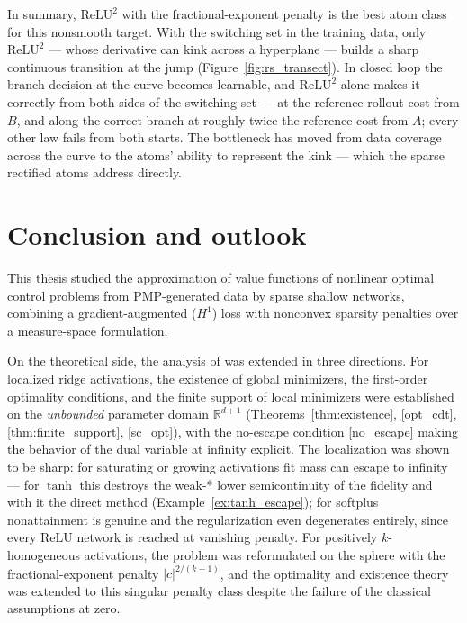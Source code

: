 \documentclass[11pt]{amsart}
\theoremstyle{definition}
\theoremstyle{remark}
\begin{document}
In summary, $\mathrm{ReLU}^{2}$ with the fractional-exponent penalty is the
best atom class for this nonsmooth target. With the switching set in the training data, only
$\mathrm{ReLU}^{2}$ --- whose derivative can kink across a hyperplane ---
builds a sharp continuous transition at the jump (Figure~\ref{fig:rs_transect}).
In closed loop the branch decision at the curve
becomes learnable, and $\mathrm{ReLU}^{2}$ alone makes it correctly from both
sides of the switching set --- at the reference rollout cost from $B$, and along
the correct branch at roughly twice the reference cost from $A$;
every other law fails from both starts. The bottleneck has moved from data
coverage across the curve to the atoms' ability to represent the kink ---
which the sparse rectified atoms address directly.


\FloatBarrier
\section{Conclusion and outlook}

This thesis studied the approximation of value functions of nonlinear optimal
control problems from PMP-generated data by sparse shallow networks, combining
a gradient-augmented ($H^1$) loss with nonconvex sparsity penalties over a
measure-space formulation.

On the theoretical side, the analysis of \cite{pieper2022nonconvex} was
extended in three directions. For localized ridge activations, the existence
of global minimizers, the first-order optimality conditions, and the finite
support of local minimizers were established on the \emph{unbounded} parameter
domain $\mathbb{R}^{d+1}$ (Theorems~\ref{thm:existence},
\ref{opt_cdt}, \ref{thm:finite_support}, \ref{sc_opt}), with the no-escape
condition \eqref{no_escape} making the behavior of the dual variable at
infinity explicit. The localization was shown to be sharp: for saturating or
growing activations fit mass can escape to infinity --- for $\tanh$ this
destroys the weak-* lower semicontinuity of the fidelity and with it the
direct method (Example~\ref{ex:tanh_escape}); for softplus nonattainment is
genuine and the regularization even degenerates entirely, since every ReLU
network is reached at vanishing penalty. For positively $k$-homogeneous
activations, the problem was reformulated on the sphere with the
fractional-exponent penalty $|c|^{2/(k+1)}$, and the optimality and existence
theory was extended to this singular penalty class despite the failure of the
classical assumptions at zero.
\end{document}
